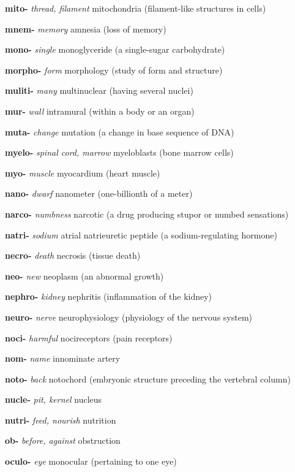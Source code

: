\documentclass[10pt]{article}
\begin{document}
\begin{multicols}{2}
\begin{hangparas}{10pt}{1}
 \textbf{mito-} \textit{thread, filament} mitochondria (filament-like structures in cells) \par
 \textbf{mnem-} \textit{memory} amnesia (loss of memory) \par
 \textbf{mono-} \textit{single} monoglyceride (a single-sugar carbohydrate) \par
 \textbf{morpho-} \textit{form} morphology (study of form and structure) \par
 \textbf{muliti-} \textit{many} multinuclear (having several nuclei) \par
 \textbf{mur-} \textit{wall} intramural (within a body or an organ) \par
 \textbf{muta-} \textit{change} mutation (a change in base sequence of DNA) \par
 \textbf{myelo-} \textit{spinal cord, marrow} myeloblasts (bone marrow cells) \par
 \textbf{myo-} \textit{muscle} myocardium (heart muscle) \par
 \textbf{nano-} \textit{dwarf} nanometer (one-billionth of a meter) \par
 \textbf{narco-} \textit{numbness} narcotic (a drug producing stupor or numbed sensations) \par
 \textbf{natri-} \textit{sodium} atrial natrieuretic peptide (a sodium-regulating hormone) \par
 \textbf{necro-} \textit{death} necrosis (tissue death) \par
 \textbf{neo-} \textit{new} neoplasm (an abnormal growth) \par
 \textbf{nephro-} \textit{kidney} nephritis (inflammation of the kidney) \par
 \textbf{neuro-} \textit{nerve} neurophysiology (physiology of the nervous system) \par
 \textbf{noci-} \textit{harmful} nocireceptors (pain receptors) \par
 \textbf{nom-} \textit{name} innominate artery \par
 \textbf{noto-} \textit{back} notochord (embryonic structure preceding the vertebral column) \par
 \textbf{nucle-} \textit{pit, kernel} nucleus \par
 \textbf{nutri-} \textit{feed, nourish} nutrition \par
 \textbf{ob-} \textit{before, against} obstruction \par
 \textbf{oculo-} \textit{eye} monocular (pertaining to one eye) \par

\end{hangparas}
\end{multicols}
\end{document}
